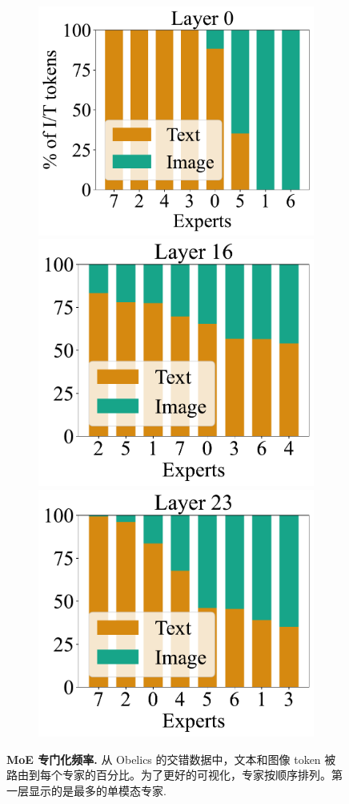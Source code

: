 \begin{figure}[t!]
    \centering
    \captionsetup{type=figure}
    \begin{subfigure}[h]{0.95\linewidth}
    \includegraphics[height=0.27\textwidth]{assets/moes/specialization/sorted/tokens_assignment_obelics_1088_150_0.pdf}
    \includegraphics[height=0.27\textwidth]{assets/moes/specialization/sorted/tokens_assignment_obelics_1088_150_16.pdf}
    \includegraphics[height=0.27\textwidth]{assets/moes/specialization/sorted/tokens_assignment_obelics_1088_150_23.pdf}
    \end{subfigure}    \caption{\textbf{MoE 专门化频率.}  
    从 Obelics 的交错数据中，文本和图像 token 被路由到每个专家的百分比。为了更好的可视化，专家按顺序排列。第一层显示的是最多的单模态专家.}
    \label{fig:tokens_assignment}
\end{figure}
